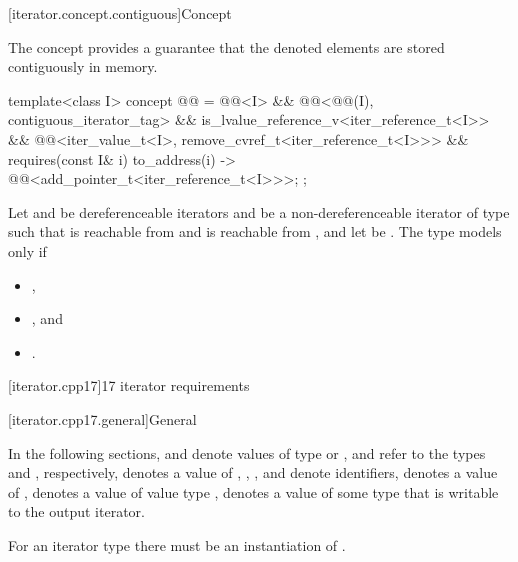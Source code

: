 [iterator.concept.contiguous]{Concept }

\pnum
The  concept provides a guarantee that
the denoted elements are stored contiguously in memory.

\begin{codeblock}
template<class I>
  concept @@ =
    @@<I> &&
    @@<@@(I), contiguous_iterator_tag> &&
    is_lvalue_reference_v<iter_reference_t<I>> &&
    @@<iter_value_t<I>, remove_cvref_t<iter_reference_t<I>>> &&
    requires(const I& i) {
      { to_address(i) } -> @@<add_pointer_t<iter_reference_t<I>>>;
    };
\end{codeblock}

\pnum
Let  and  be dereferenceable iterators and
 be a non-dereferenceable iterator of type 
such that  is reachable from  and
 is reachable from ,
and let  be .
The type  models  only if
\begin{itemize}
\item {},
\item {}, and
\item {}.
\end{itemize}

[iterator.cpp17]{\Cpp{}17 iterator requirements}

[iterator.cpp17.general]{General}

\pnum
In the following sections,
and
denote values of type
 or ,
 and  refer to the
types  and
, respectively,
denotes a value of
,
,
,
and
denote identifiers,
denotes a value of
,
denotes a value of value type
,
denotes a value of some type that is writable to the output iterator.
\begin{note}
For an iterator type  there must be an instantiation
of .
\end{note}

